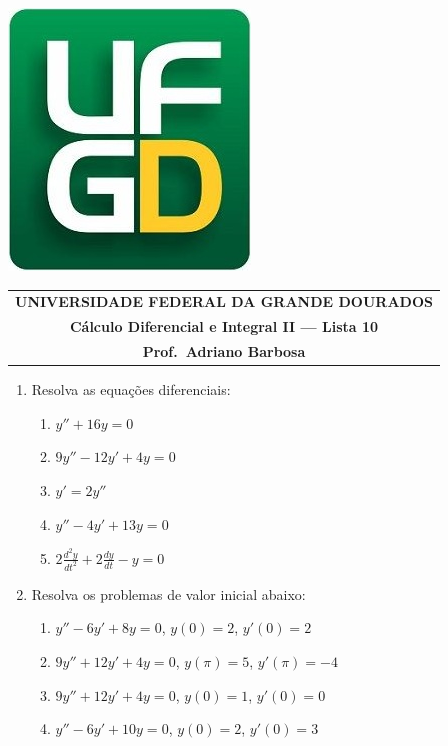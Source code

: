 \documentclass[a4paper,5pt]{amsbook}
\newcommand{\ds}{\displaystyle}
\begin{document}
\thispagestyle{empty}
\pagestyle{empty}
\begin{minipage}[h]{0.14\textwidth}
	\includegraphics[scale=0.24]{../../ufgd.png}
\end{minipage}
\begin{minipage}[h]{\textwidth}
\begin{tabular}{c}
{{\bf UNIVERSIDADE FEDERAL DA GRANDE DOURADOS}}\\
{{\bf C\'{a}lculo Diferencial e Integral II --- Lista 10}}\\
{{\bf Prof.\ Adriano Barbosa}}\\
\end{tabular}
\vspace{-0.45cm}
%
\end{minipage}


\vspace{1cm}
\begin{enumerate}
	\vspace{0.5cm}
    \item Resolva as equa\c{c}\~oes diferenciais:
        \begin{enumerate}
            \setlength\itemsep{0.2cm}
            \item $y'' +16y=0$
            \item $9y''-12y'+4y=0$
            \item $y'=2y''$
            \item $y''-4y'+13y=0$
            \item $2\ds\frac{d^2y}{dt^2}+2\ds\frac{dy}{dt}-y=0$
        \end{enumerate}

    \vspace{0.5cm}
    \item Resolva os problemas de valor inicial abaixo:
        \begin{enumerate}
            \setlength\itemsep{0.2cm}
            \item $y''-6y'+8y=0$, $y(0)=2$, $y'(0)=2$
            \item $9y''+12y'+4y=0$, $y(\pi)=5$, $y'(\pi)=-4$
            \item $9y''+12y'+4y=0$, $y(0)=1$, $y'(0)=0$
            \item $y''-6y'+10y=0$, $y(0)=2$, $y'(0)=3$
        \end{enumerate}
\end{enumerate}
\end{document}
